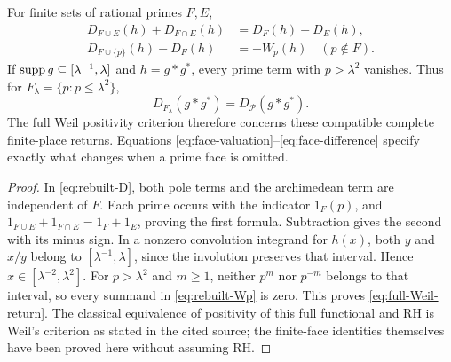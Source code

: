 \begin{theorem}\label{thm:prime-face-weil}
For finite sets of rational primes $F,E$,
\begin{align}
 D_{F\cup E}(h)+D_{F\cap E}(h)&=D_F(h)+D_E(h),\label{eq:face-valuation}\\
 D_{F\cup\{p\}}(h)-D_F(h)&=-W_p(h)\quad(p\notin F).
 \label{eq:face-difference}
\end{align}
If $\operatorname{supp} g\subseteq[\lambda^{-1},\lambda]$ and $h=g*g^*$, every prime term with $p>\lambda^2$ vanishes. Thus for $F_\lambda=\{p:p\le\lambda^2\}$,
\begin{equation}\label{eq:full-Weil-return}
 D_{F_\lambda}(g*g^*)=D_{\mathcal P}(g*g^*).
\end{equation}
The full Weil positivity criterion therefore concerns these compatible complete finite-place returns. Equations \eqref{eq:face-valuation}--\eqref{eq:face-difference} specify exactly what changes when a prime face is omitted.
\end{theorem}
\begin{proof}
In \eqref{eq:rebuilt-D}, both pole terms and the archimedean term are independent of $F$. Each prime occurs with the indicator $1_F(p)$, and
$1_{F\cup E}+1_{F\cap E}=1_F+1_E$, proving the first formula. Subtraction gives the second with its minus sign. In a nonzero convolution integrand for $h(x)$, both $y$ and $x/y$ belong to $[\lambda^{-1},\lambda]$, since the involution preserves that interval. Hence $x\in[\lambda^{-2},\lambda^2]$. For $p>\lambda^2$ and $m\ge1$, neither $p^m$ nor $p^{-m}$ belongs to that interval, so every summand in \eqref{eq:rebuilt-Wp} is zero. This proves \eqref{eq:full-Weil-return}. The classical equivalence of positivity of this full functional and RH is Weil's criterion as stated in the cited source; the finite-face identities themselves have been proved here without assuming RH.
\end{proof}

